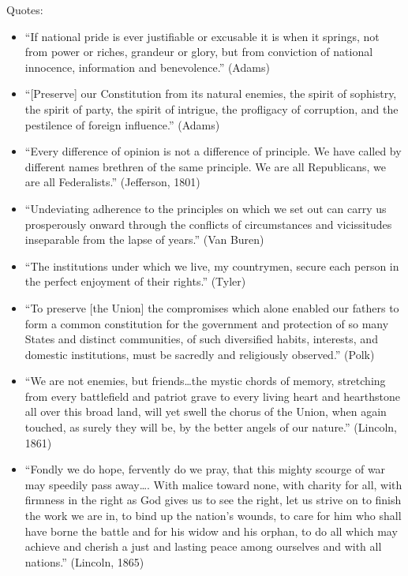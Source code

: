 \documentclass[
]{article}
\begin{document}
Quotes:

\begin{itemize}
\item
  ``If national pride is ever justifiable or excusable it is when it
  springs, not from power or riches, grandeur or glory, but from
  conviction of national innocence, information and benevolence.''
  (Adams)
\item
  ``{[}Preserve{]} our Constitution from its natural enemies, the spirit
  of sophistry, the spirit of party, the spirit of intrigue, the
  profligacy of corruption, and the pestilence of foreign influence.''
  (Adams)
\item
  ``Every difference of opinion is not a difference of principle. We
  have called by different names brethren of the same principle. We are
  all Republicans, we are all Federalists.'' (Jefferson, 1801)
\item
  ``Undeviating adherence to the principles on which we set out can
  carry us prosperously onward through the conflicts of circumstances
  and vicissitudes inseparable from the lapse of years.'' (Van Buren)
\item
  ``The institutions under which we live, my countrymen, secure each
  person in the perfect enjoyment of their rights.'' (Tyler)
\item
  ``To preserve {[}the Union{]} the compromises which alone enabled our
  fathers to form a common constitution for the government and
  protection of so many States and distinct communities, of such
  diversified habits, interests, and domestic institutions, must be
  sacredly and religiously observed.'' (Polk)
\item
  ``We are not enemies, but friends\ldots the mystic chords of memory,
  stretching from every battlefield and patriot grave to every living
  heart and hearthstone all over this broad land, will yet swell the
  chorus of the Union, when again touched, as surely they will be, by
  the better angels of our nature.'' (Lincoln, 1861)
\item
  ``Fondly we do hope, fervently do we pray, that this mighty scourge of
  war may speedily pass away\ldots. With malice toward none, with
  charity for all, with firmness in the right as God gives us to see the
  right, let us strive on to finish the work we are in, to bind up the
  nation's wounds, to care for him who shall have borne the battle and
  for his widow and his orphan, to do all which may achieve and cherish
  a just and lasting peace among ourselves and with all nations.''
  (Lincoln, 1865)

\end{itemize}
\end{document}
